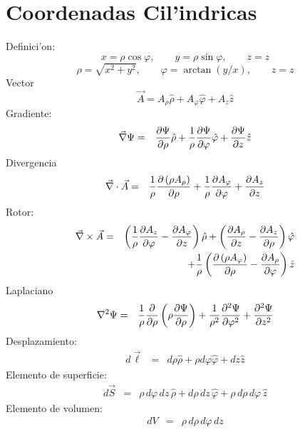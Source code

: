 \section{Coordenadas Cil'indricas}
Definici'on:
\begin{equation}
 x =\rho\cos\varphi ,\qquad 
 y =\rho\sin\varphi ,\qquad 
 z = z 
\end{equation}
\begin{equation}
\rho =\sqrt{x^2 + y^2} ,\qquad
\varphi =\arctan{(y/x)},\qquad
 z= z 
\end{equation}
Vector
\begin{equation}
\vec{A} =A_\rho {\hat\rho} + A_\varphi {\hat\varphi} +
A_z {\hat z} 
\end{equation}
Gradiente:
\begin{eqnarray}
\vec\nabla\Psi&=&{\partial\Psi\over\partial\rho} {\hat\rho} 
 + {1\over\rho}{\partial\Psi\over\partial\varphi} {\hat\varphi} 
 + {\partial\Psi\over\partial z} {\hat z}
\end{eqnarray} 
Divergencia
\begin{eqnarray}
\vec\nabla\cdot\vec{A}
&=& {1\over\rho}{\partial\left(\rho A_\rho\right)\over\partial
\rho} + {1\over\rho}{\partial A_\varphi\over\partial\varphi} 
 + {\partial A_z\over\partial z}
\end{eqnarray} 
Rotor:
\begin{eqnarray}
\vec\nabla\times\vec{A}
&=&\left({1\over\rho}{\partial A_z\over\partial\varphi}
 - {\partial A_\varphi\over\partial z}\right) {\hat\rho} + 
\left({\partial A_\rho\over\partial z} - {\partial A_z\over
\partial\rho}\right) {\hat\varphi}\nonumber\\
&&+ {1\over\rho}\left({\partial\left(\rho A_\varphi\right)\over
\partial\rho} - {\partial A_\rho\over\partial\varphi}\right) {\hat z}
\end{eqnarray}
Laplaciano
\begin{eqnarray}
\nabla^2\Psi
&=& {1\over\rho}{\partial\over\partial\rho}\left(\rho {\partial\Psi\over
\partial\rho}\right) 
 + {1\over\rho^2}{\partial^2\Psi\over\partial\varphi^2} 
 + {\partial^2\Psi\over\partial z^2}\\
\end{eqnarray} 
Desplazamiento:
\begin{eqnarray}
 d\vec{\ell}
 &=& d\rho {\hat\rho} +\rho d\varphi {\hat\varphi} +dz {\hat z} 
\end{eqnarray} 
Elemento de superficie:
\begin{eqnarray}
 d\vec{S} 
&=&\rho\, d\varphi\, dz\, {\hat\rho} + d\rho
\,dz\, {\hat\varphi} +\rho\,d\rho\, d\varphi\, {\hat z}
\end{eqnarray}
Elemento de volumen:
\begin{eqnarray}
 dV
 &=&\rho\, d\rho\, d\varphi\, dz
\end{eqnarray} 

